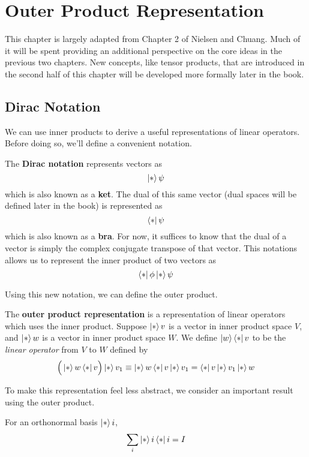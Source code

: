 \chapter{Outer Product Representation} 

This chapter is largely adapted from Chapter 2 of Nielsen and Chuang. Much of it will be spent providing an additional perspective on the core ideas in the previous two chapters. New concepts, like tensor products, that are introduced in the second half of this chapter will be developed more formally later in the book. 
\section{Dirac Notation} 

We can use inner products to derive a useful representations of linear operators. Before doing so, we'll define a convenient notation. 

\begin{definition}
The \textbf{Dirac notation} represents vectors as 
$$\ket*{\psi}$$ which is also known as a \textbf{ket}. The dual of this same vector (dual spaces will be defined later in the book) is represented as 
$$\bra*{\psi}$$ which is also known as a \textbf{bra}. For now, it suffices to know that the dual of a vector is simply the complex conjugate transpose of that vector. This notations allows us to represent the inner product of two vectors as 
$$\bra*{\phi}\ket*{\psi}$$
\end{definition}

Using this new notation, we can define the outer product. 

\begin{definition}
The \textbf{outer product representation} is a representation of linear operators which uses the inner product. Suppose $\ket*{v}$ is a vector in inner product space $V$, and $\ket*{w}$ is a vector in inner product space $W$. We define $\ket{w} \bra*{v}$ to be the \textit{linear operator} from $V$ to $W$ defined by 
$$\Big(\ket*{w} \bra*{v} \Big) \ket*{v_{1}} \equiv \ket*{w} \bra*{v} \ket*{v_{1}} = \bra*{v} \ket*{v_{1}} \ket*{w}$$
\end{definition}

To make this representation feel less abstract, we consider an important result using the outer product. 

\begin{lemma}
For an orthonormal basis $\ket*{i}$, 
$$\sum_{i} \ket*{i} \bra*{i} = I$$
\end{lemma}

